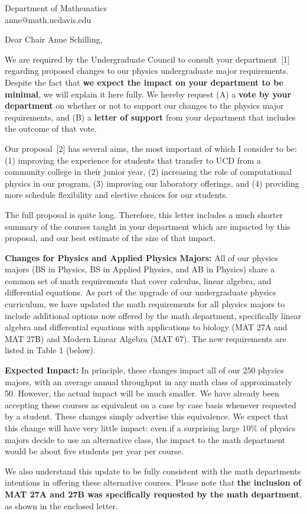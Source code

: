 \documentclass[letterpaper,12pt]{letter}
\def\letterparta{
We are required by the Undergraduate Council to consult your
department~[1] regarding proposed changes to our physics undergraduate major requirements.  Despite the fact that {\bf we expect the
  impact on your department to be minimal}, we will explain it here
fully.  We hereby request (A) a {\bf vote by your department} on
whether or not to support our changes to the physics major
requirements, and (B) a {\bf letter of support} from your department
that includes the outcome of that vote.

Our proposal~[2] has several aims, the most important of which I
consider to be: (1) improving the experience for students that
transfer to UCD from a community college in their junior year, (2)
increasing the role of computational physics in our program, (3)
improving our laboratory offerings, and (4) providing more schedule
flexibility and elective choices for our students.

The full proposal is quite long.  Therefore, this letter includes a
much shorter summary of the courses taught in your department which
are impacted by this proposal, and our best estimate of the size of
that impact.
}
\begin{document}

\begin{letter}{Department of Mathematics \\ anne@math.ucdavis.edu}

\opening{Dear Chair Anne Schilling,}

\letterparta

{\bf Changes for Physics and Applied Physics Majors:} All of our
physics majors (BS in Physics, BS in Applied Physics, and AB in
Physics) share a common set of math requirements that cover calculus,
linear algebra, and differential equations.  As part of the upgrade of
our undergraduate physics curriculum, we have updated the math
requirements for all physics majors to include additional options now
offered by the math department, specifically linear algebra and
differential equations with applications to biology (MAT 27A and MAT
27B) and Modern Linear Algebra (MAT 67).  The new requirements are
listed in Table 1 (below).

{\bf Expected Impact:} In principle, these changes impact all of our
250 physics majors, with an average annual throughput in any math
class of approximately 50.  However, the actual impact will be much
smaller.  We have already been accepting these courses as equivalent
on a case by case basis whenever requested by a student.  These
changes simply advertise this equivalence.  We expect that this change
will have very little impact: even if a surprising large $10\%$ of
physics majors decide to use an alternative class, the impact to the
math department would be about five students per year per course.

We also understand this update to be fully consistent with the math
departments intentions in offering these alternative courses.  Please
note that {\bf the inclusion of MAT 27A and 27B was specifically
  requested by the math department}, as shown in the enclosed letter.


\end{letter}
\end{document}
